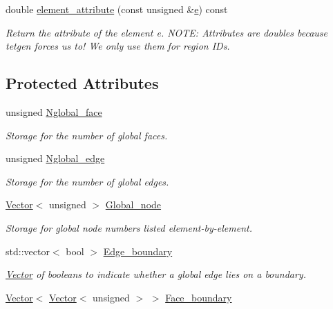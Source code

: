 \begin{DoxyCompactItemize}
double \hyperlink{classoomph_1_1TetgenScaffoldMesh_a9a116f1e40f23e7ef0a3317a79165cc9}{element\+\_\+attribute} (const unsigned \&\hyperlink{cfortran_8h_a37cd013acc76697829c324bdd8562d82}{e}) const
\begin{DoxyCompactList}\small\item\em Return the attribute of the element e. N\+O\+TE\+: Attributes are doubles because tetgen forces us to! We only use them for region I\+Ds. \end{DoxyCompactList}\end{DoxyCompactItemize}
\subsection*{Protected Attributes}
\begin{DoxyCompactItemize}
\item 
unsigned \hyperlink{classoomph_1_1TetgenScaffoldMesh_a0439e81af29a84043e68d107c71a66c4}{Nglobal\+\_\+face}
\begin{DoxyCompactList}\small\item\em Storage for the number of global faces. \end{DoxyCompactList}\item 
unsigned \hyperlink{classoomph_1_1TetgenScaffoldMesh_aafa53fcb1ac09cc8667783a0d514def3}{Nglobal\+\_\+edge}
\begin{DoxyCompactList}\small\item\em Storage for the number of global edges. \end{DoxyCompactList}\item 
\hyperlink{classoomph_1_1Vector}{Vector}$<$ unsigned $>$ \hyperlink{classoomph_1_1TetgenScaffoldMesh_ada16a9ad5226a937365e6d88e40e7af4}{Global\+\_\+node}
\begin{DoxyCompactList}\small\item\em Storage for global node numbers listed element-\/by-\/element. \end{DoxyCompactList}\item 
std\+::vector$<$ bool $>$ \hyperlink{classoomph_1_1TetgenScaffoldMesh_a023c244b1bac044abbb0d52a25f26d89}{Edge\+\_\+boundary}
\begin{DoxyCompactList}\small\item\em \hyperlink{classoomph_1_1Vector}{Vector} of booleans to indicate whether a global edge lies on a boundary. \end{DoxyCompactList}\item 
\hyperlink{classoomph_1_1Vector}{Vector}$<$ \hyperlink{classoomph_1_1Vector}{Vector}$<$ unsigned $>$ $>$ \hyperlink{classoomph_1_1TetgenScaffoldMesh_aefb3cd9a27c4c507ae2e7ca2da8217bd}{Face\+\_\+boundary}

\end{DoxyCompactItemize}
